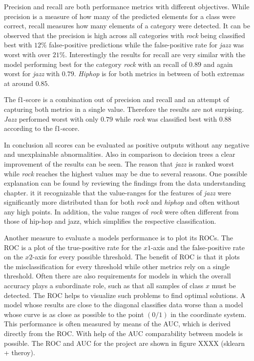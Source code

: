 Precision and recall are both performance metrics with different objectives. While precision is a measure of how many of the 
predicted elements for a class were correct, recall measures how many elements of a category were detected. It can be observed that 
the precision is high across all categories with \emph{rock} being classified best with \(12\)\% false-positive predictions while 
the false-positive rate for \emph{jazz} was worst with over \(21\)\%. Interestingly the results for recall are very similar with the model 
performing best for the category \emph{rock} with an recall of \(0.89\) and again worst for \emph{jazz} with \(0.79\). \emph{Hiphop} is for both metrics in 
between of both extremas at around \(0.85\). 

The f1-score is a combination out of precision and recall and an attempt of capturing both metrics in a single value. Therefore
the results are not surpising. \emph{Jazz} performed worst with only \(0.79\) while \emph{rock} was classified best with \(0.88\) according to the 
f1-score. 

In conclusion all scores can be evaluated as positive outputs without any negative and unexplainable abnormalities. Also in comparison 
to decision trees a clear improvement of the results can be seen. The reason that \emph{jazz} is ranked worst while \emph{rock} reaches the 
highest values may be due to several reasons. One possible explanation can be found by reviewing the findings from the data 
understanding chapter. it it recognizable that the value-ranges for the features of \emph{jazz} were significantly more distributed 
than for both \emph{rock} and \emph{hiphop} and often without any high points. In addition, the value ranges of \emph{rock} were often different from 
those of hip-hop and jazz, which simplifies the respective classification. 

Another measure to evaluate a models performance is to plot its \ac{ROC}s. The \ac{ROC} is a plot of the true-positive
rate for the \(x1\)-axis and the false-positive rate on the \(x2\)-axis for every possible threshold. The benefit of \ac{ROC} is that it plots the 
misclassification for every threshold while other metrics rely on a single threshold. Often there are also requirements for 
models in which the overall accuracy plays a subordinate role, such as that all samples of class \(x\) must be detected. The \ac{ROC} helps 
to visualize such problems to find optimal solutions. A model whose results are close to the diagonal classifies data worse than a 
model whose curve is as close as possible to the point \((0/1)\) in the coordinate system. This performance is often measured by means of 
the \ac{AUC}, which is derived directly from the \ac{ROC}. With help of the \ac{AUC} comparability between models is possible. The \ac{ROC} and \ac{AUC} for 
the project are shown in figure XXXX (sklearn + theroy).

